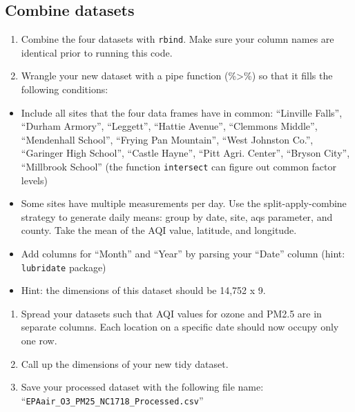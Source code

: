 \documentclass[
]{article}
\providecommand{\tightlist}{%
  \setlength{\itemsep}{0pt}\setlength{\parskip}{0pt}}
\begin{document}
\hypertarget{combine-datasets}{%
\subsection{Combine datasets}\label{combine-datasets}}

\begin{enumerate}
\def\labelenumi{\arabic{enumi}.}
\setcounter{enumi}{6}
\tightlist
\item
  Combine the four datasets with \texttt{rbind}. Make sure your column
  names are identical prior to running this code.
\item
  Wrangle your new dataset with a pipe function (\%\textgreater\%) so
  that it fills the following conditions:
\end{enumerate}

\begin{itemize}
\item
  Include all sites that the four data frames have in common: ``Linville
  Falls'', ``Durham Armory'', ``Leggett'', ``Hattie Avenue'', ``Clemmons
  Middle'', ``Mendenhall School'', ``Frying Pan Mountain'', ``West
  Johnston Co.'', ``Garinger High School'', ``Castle Hayne'', ``Pitt
  Agri. Center'', ``Bryson City'', ``Millbrook School'' (the function
  \texttt{intersect} can figure out common factor levels)
\item
  Some sites have multiple measurements per day. Use the
  split-apply-combine strategy to generate daily means: group by date,
  site, aqs parameter, and county. Take the mean of the AQI value,
  latitude, and longitude.
\item
  Add columns for ``Month'' and ``Year'' by parsing your ``Date'' column
  (hint: \texttt{lubridate} package)
\item
  Hint: the dimensions of this dataset should be 14,752 x 9.
\end{itemize}

\begin{enumerate}
\def\labelenumi{\arabic{enumi}.}
\setcounter{enumi}{8}
\tightlist
\item
  Spread your datasets such that AQI values for ozone and PM2.5 are in
  separate columns. Each location on a specific date should now occupy
  only one row.
\item
  Call up the dimensions of your new tidy dataset.
\item
  Save your processed dataset with the following file name:
  ``\texttt{EPAair\_O3\_PM25\_NC1718\_Processed.csv}''
\end{enumerate}
\end{document}
